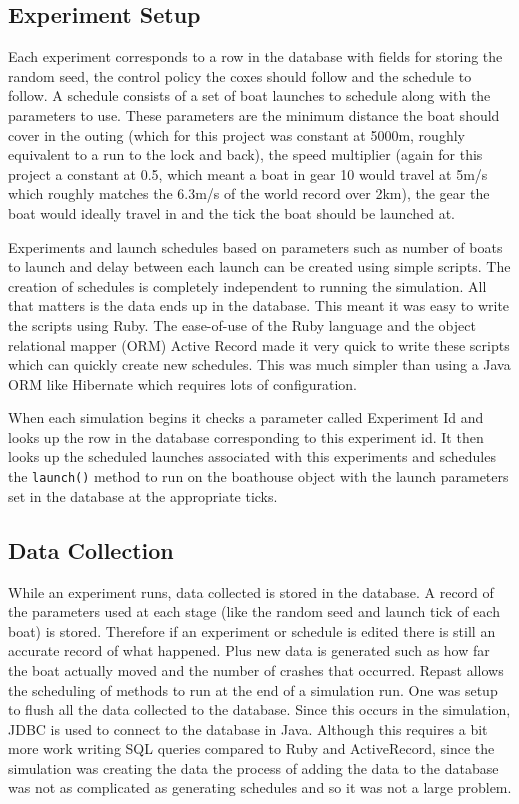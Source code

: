   \subsection{Experiment Setup}
  Each experiment corresponds to a row in the database with fields for storing the random seed, the control policy the coxes should follow and the schedule to follow. A schedule consists of a set of boat launches to schedule along with the parameters to use. These parameters are the minimum distance the boat should cover in the outing (which for this project was constant at 5000m, roughly equivalent to a run to the lock and back), the speed multiplier (again for this project a constant at 0.5, which meant a boat in gear 10 would travel at 5m/s which roughly matches the 6.3m/s of the world record over 2km), the gear the boat would ideally travel in and the tick the boat should be launched at. 
  
  Experiments and launch schedules based on parameters such as number of boats to launch and delay between each launch can be created using simple scripts. The creation of schedules is completely independent to running the simulation. All that matters is the data ends up in the database. This meant it was easy to write the scripts using Ruby. The ease-of-use of the Ruby language and the object relational mapper (ORM) Active Record made it very quick to write these scripts which can quickly create new schedules. This was much simpler than using a Java ORM like Hibernate which requires lots of configuration.
  
  When each simulation begins it checks a parameter called Experiment Id and looks up the row in the database corresponding to this experiment id. It then looks up the scheduled launches associated with this experiments and schedules the \texttt{launch()} method to run on the boathouse object with the launch parameters set in the database at the appropriate ticks.
  
  \subsection{Data Collection}
  While an experiment runs, data collected is stored in the database. A record of the parameters used at each stage (like the random seed and launch tick of each boat) is stored. Therefore if an experiment or schedule is edited there is still an accurate record of what happened. Plus new data is generated such as how far the boat actually moved and the number of crashes that occurred. Repast allows the scheduling of methods to run at the end of a simulation run. One was setup to flush all the data collected to the database. Since this occurs in the simulation, JDBC is used to connect to the database in Java. Although this requires a bit more work writing SQL queries compared to Ruby and ActiveRecord, since the simulation was creating the data the process of adding the data to the database was not as complicated as generating schedules and so it was not a large problem.
  
